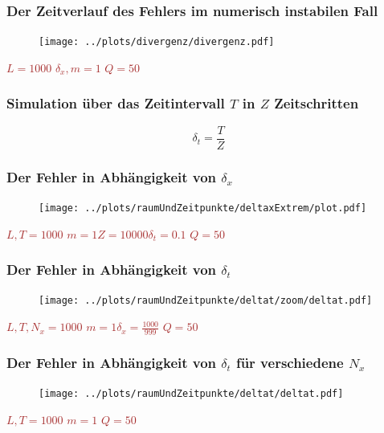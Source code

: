 \documentclass{beamer}
\begin{document}
\begin{frame}
\frametitle{Der Zeitverlauf des Fehlers im numerisch instabilen Fall}
\begin{figure}
	\texttt{[image: ../plots/divergenz/divergenz.pdf]}
	\label{divergenzzeitentwicklung}
\end{figure}
\textcolor{brown}{
\(L = 1000\)\hspace{3em} \(\delta_x, m = 1\)\hspace{3em} \(Q = 50\)
}
\end{frame}
\begin{frame}
	\frametitle{Simulation über das Zeitintervall \(T\) in \(Z\) Zeitschritten}
	\begin{equation*}
		\delta_t = \frac{T}{Z}
	\end{equation*}
\end{frame}
\begin{frame}
\frametitle{Der Fehler in Abhängigkeit von \(\delta_x\)}
\begin{figure}
	\texttt{[image: ../plots/raumUndZeitpunkte/deltaxExtrem/plot.pdf]}
	\label{deltaxthetafit}
\end{figure}
\textcolor{brown}{
\(L,T = 1000\)\hspace{3em} \(m = 1\)\hspace{3em}\(Z = 10000\)\hspace{3em}\(\delta_t = 0.1\)\hspace{3em} \(Q = 50\)
}
\end{frame}
\begin{frame}
\frametitle{Der Fehler in Abhängigkeit von \(\delta_t\)}
\begin{figure}
	\texttt{[image: ../plots/raumUndZeitpunkte/deltat/zoom/deltat.pdf]}
	\label{deltatthetanah}
\end{figure}
\textcolor{brown}{
\(L,T, N_x = 1000\)\hspace{3em} \(m = 1\)\hspace{3em}\(\delta_x = \frac{1000}{999}\)\hspace{3em} \(Q = 50\)
}
\end{frame}
\begin{frame}
\frametitle{Der Fehler in Abhängigkeit von \(\delta_t\) für verschiedene \(N_x\)}
\begin{figure}
	\texttt{[image: ../plots/raumUndZeitpunkte/deltat/deltat.pdf]}
	\label{deltattheta}
\end{figure}
\textcolor{brown}{
\(L,T = 1000\)\hspace{3em} \(m = 1\)\hspace{3em} \(Q = 50\)
}
\end{frame}
\end{document}

